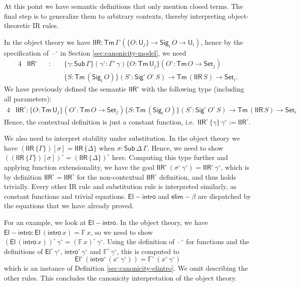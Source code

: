\documentclass[acmsmall,screen,review,anonymous]{acmart}
\newcommand{\msf}[1]{{\mathsf{#1}}}
\newcommand{\mbb}[1]{\mathbb{#1}}
\newcommand{\U}{\msf{U}}
\newcommand{\Set}{\msf{Set}}
\newcommand{\El}{\msf{El}}
\newcommand{\Sig}{\msf{Sig}}
\newcommand{\blank}{{\mathord{\hspace{1pt}\text{--}\hspace{1pt}}}}
\newcommand{\intro}{\msf{intro}}
\newcommand{\elim}{\msf{elim}}
\newcommand{\IIR}{\msf{IIR}}
\newcommand{\Sub}{\msf{Sub}}
\newcommand{\Tm}{\msf{Tm}}
\newcommand{\w}{\circ}
\newcommand{\Elintro}{\msf{El\!\!-\!\!intro}}
\newcommand{\elimbeta}{\elim\!-\!\!\beta}
\newcommand{\F}{\mbb{F}}
\begin{document}
\begin{definition}
At this point we have semantic definitions that only mention closed terms. The final step is to
generalize them to arbitrary contexts, thereby interpreting object-theoretic IR rules.

In the object theory we have $\IIR : \Tm\,\Gamma\,(\{O : \U_j\} \to \Sig_i\,O \to \U_i)$, hence by the specification
of $\blank^\w$ in Section \ref{sec:canonicity-model}, we need
\begin{alignat*}{4}
  & \IIR^\w &&:\,\,&& \{\gamma : \Sub\,\Gamma\}(\gamma^\w : \Gamma^\w\,\gamma)\{O : \Tm\,\U_j\}(O^\w : \Tm\,O \to \Set_j)\\
  &         &&     && \{S : \Tm\,(\Sig_i\,O)\}(S^\w : \Sig^\w\,O^\w\,S) \to \Tm\,(\IIR\,S) \to \Set_i.
\end{alignat*}
We have previously defined the semantic $\IIR^\w$ with the following type (including all parameters):
\begin{alignat*}{4}
  & \IIR^\w : \{O : \Tm\,\U_j\}(O^\w : \Tm\,O \to \Set_j)\{S : \Tm\,(\Sig_i\,O)\}(S^\w : \Sig^\w\,O^\w\,S) \to \Tm\,(\IIR\,S) \to \Set_i
\end{alignat*}
Hence, the contextual definition is just a constant function, i.e.\ $\IIR^\w\,\{\gamma\}\,\gamma^\w
:= \IIR^\w$.

We also need to interpret stability under substitution. In the object theory we have
$(\IIR\,\{\Gamma\})[\sigma] = \IIR\,\{\Delta\}$ when $\sigma : \Sub\,\Delta\,\Gamma$. Hence, we need
to show $((\IIR\,\{\Gamma\})[\sigma])^\w = (\IIR\,\{\Delta\})^\w$ here. Computing this type further
and applying function extensionality, we have the goal $\IIR^\w\,(\sigma^\w\,\gamma^\w) =
\IIR^\w\,\gamma^\w$, which is by definition $\IIR^\w = \IIR^\w$ for the non-contextual $\IIR^\w$
definition, and thus holds trivially. Every other IR rule and substitution rule is interpreted
similarly, as constant functions and trivial equations. $\Elintro$ and $\elimbeta$ are dispatched by
the equations that we have already proved.

For an example, we look at $\Elintro$. In the object theory, we have $\Elintro : \El\,(\intro\,x) =
\F\,x$, so we need to show $(\El\,(\intro\,x))^\w\,\gamma^\w = (\F\,x)^\w\,\gamma^\w$. Using the
definition of $\blank^\w$ for functions and the definitions of $\El^\w\,\gamma^\w$,
$\intro^\w\,\gamma^\w$ and $\F^\w\,\gamma^\w$, this is computed to
\[ \El^\w\,(\intro^\w\,(x^\w\,\gamma^\w)) = \F^\w\,(x^\w\,\gamma^\w) \]
which is an instance of Definition \ref{sec:canonicity-elintro}. We omit describing the other
rules. This concludes the canonicity interpretation of the object theory.
\end{definition}
\end{document}
